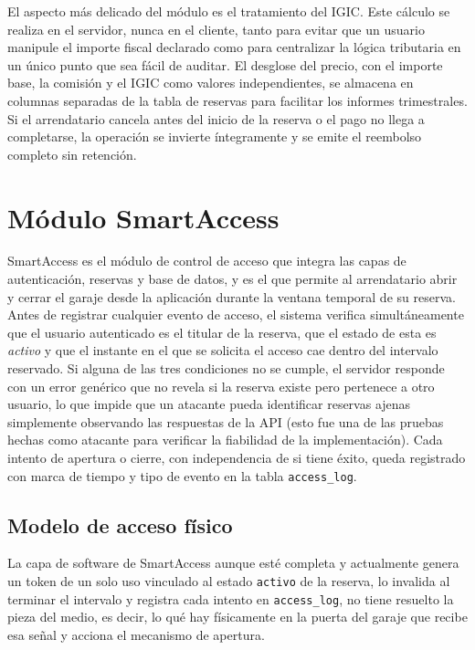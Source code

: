 El aspecto más delicado del módulo es el tratamiento del IGIC. Este cálculo se realiza en el servidor, nunca en el cliente, tanto para evitar que un usuario manipule el importe fiscal declarado como para centralizar la lógica tributaria en un único punto que sea fácil de auditar. El desglose del precio, con el importe base, la comisión y el IGIC como valores independientes, se almacena en columnas separadas de la tabla de reservas para facilitar los informes trimestrales. Si el arrendatario cancela antes del inicio de la reserva o el pago no llega a completarse, la operación se invierte íntegramente y se emite el reembolso completo sin retención.

\section{Módulo SmartAccess}
\label{sec:impl_smartaccess}

SmartAccess es el módulo de control de acceso que integra las capas de autenticación, reservas y base de datos, y es el que permite al arrendatario abrir y cerrar el garaje desde la aplicación durante la ventana temporal de su reserva. Antes de registrar cualquier evento de acceso, el sistema verifica simultáneamente que el usuario autenticado es el titular de la reserva, que el estado de esta es \textit{activo} y que el instante en el que se solicita el acceso cae dentro del intervalo reservado. Si alguna de las tres condiciones no se cumple, el servidor responde con un error genérico que no revela si la reserva existe pero pertenece a otro usuario, lo que impide que un atacante pueda identificar reservas ajenas simplemente observando las respuestas de la API (esto fue una de las pruebas hechas como atacante para verificar la fiabilidad de la implementación). Cada intento de apertura o cierre, con independencia de si tiene éxito, queda registrado con marca de tiempo y tipo de evento en la tabla \texttt{access\_log}.

\subsection{Modelo de acceso físico}
\label{subsec:modelo_acceso_fisico}

La capa de software de SmartAccess aunque esté completa y actualmente genera un token de un solo uso vinculado al estado \texttt{activo} de la reserva, lo invalida al terminar el intervalo y registra cada intento en \texttt{access\_log}, no tiene resuelto la pieza del medio, es decir, lo qué hay físicamente en la puerta del garaje que recibe esa señal y acciona el mecanismo de apertura.

